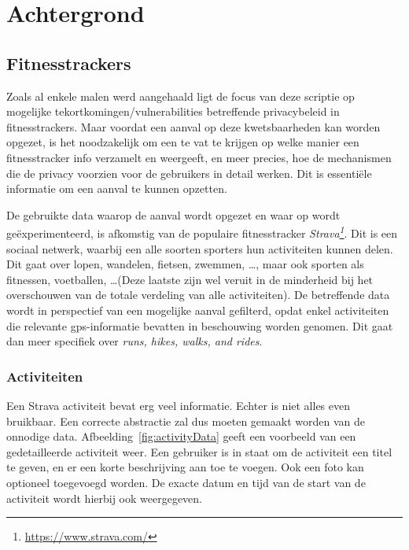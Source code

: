 
\chapter{Achtergrond}

\section{Fitnesstrackers}
Zoals al enkele malen werd aangehaald ligt de focus van deze scriptie op
mogelijke tekortkomingen/vulnerabilities betreffende privacybeleid in
fitnesstrackers. Maar voordat een aanval op deze kwetsbaarheden kan worden
opgezet, is het noodzakelijk om een te vat te krijgen op welke manier een
fitnesstracker info verzamelt en weergeeft, en meer precies, hoe de mechanismen
die de privacy voorzien voor de gebruikers in detail werken. Dit is essentiële
informatie om een aanval te kunnen opzetten.

De gebruikte data waarop de aanval wordt opgezet en waar op wordt
geëxperimenteerd, is afkomstig van de populaire fitnesstracker
\textit{Strava\footnote{\url{https://www.strava.com/}}}. Dit is een sociaal
netwerk, waarbij een alle soorten sporters hun activiteiten kunnen delen. Dit
gaat over lopen, wandelen, fietsen, zwemmen, \ldots, maar ook sporten als
fitnessen, voetballen, \ldots (Deze laatste zijn wel veruit in de minderheid
bij het overschouwen van de totale verdeling van alle
activiteiten\cite{Stravas24:online}). De betreffende data wordt in perspectief
van een mogelijke aanval gefilterd, opdat enkel activiteiten die relevante
gps-informatie bevatten in beschouwing worden genomen. Dit gaat dan meer
specifiek over \textit{runs, hikes, walks, and rides}.

\subsection{Activiteiten}
Een Strava activiteit bevat erg veel informatie. Echter is niet alles even
bruikbaar. Een correcte abstractie zal dus moeten gemaakt worden van de
onnodige data. Afbeelding~\ref{fig:activityData} geeft een voorbeeld van een
gedetailleerde activiteit weer. Een gebruiker is in staat om de activiteit een
titel te geven, en er een korte beschrijving aan toe te voegen. Ook een foto
kan optioneel toegevoegd worden. De exacte datum en tijd van de start van de
activiteit wordt hierbij ook weergegeven.


